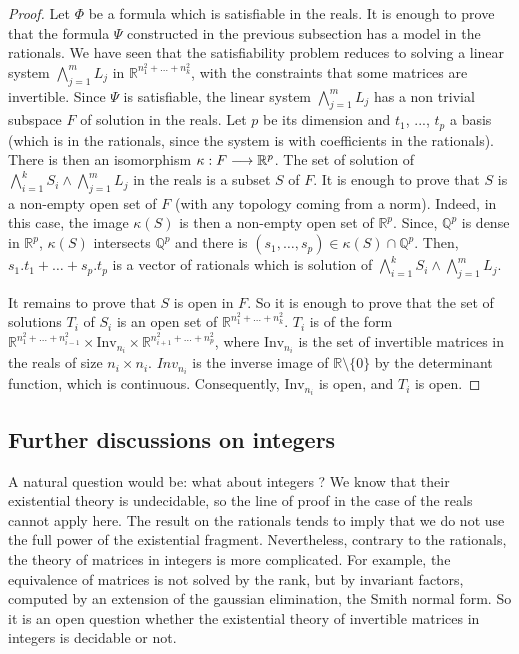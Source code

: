 \begin{proof}
Let $\Phi$ be a formula which is satisfiable in the reals. It is enough to prove that the formula $\Psi$ constructed in the previous subsection has a model in the rationals. We have seen that the satisfiability problem reduces to solving a linear system $\bigwedge\limits_{j=1}^m L_j$ in $\mathbb{R}^{n_1^2+\ldots+n_k^2}$, with the constraints that some matrices are invertible. Since $\Psi$ is satisfiable, the linear system $\bigwedge\limits_{j=1}^m L_j$ has a non trivial subspace $F$ of solution in the reals. Let $p$ be its dimension and $t_1$, ..., $t_p$ a basis (which is in the rationals, since the system is with coefficients in the rationals). 
There is then an isomorphism $\kappa : F \longrightarrow \mathbb{R}^p$. The set of solution of $\bigwedge\limits_{i=1}^k S_i \wedge \bigwedge\limits_{j=1}^m L_j$ in the reals is a subset $S$ of $F$. It is enough to prove that $S$ is a non-empty open set of $F$ (with any topology coming from a norm). Indeed, in this case, the image $\kappa(S)$ is then a non-empty open set of $\mathbb{R}^p$. Since, $\mathbb{Q}^p$ is dense in $\mathbb{R}^p$, $\kappa(S)$ intersects $\mathbb{Q}^p$ and there is $(s_1,\ldots,s_p) \in \kappa(S)\cap\mathbb{Q}^p$. Then, $s_1.t_1 + \ldots + s_p.t_p$ is a vector of rationals which is solution of $\bigwedge\limits_{i=1}^k S_i \wedge \bigwedge\limits_{j=1}^m L_j$.

It remains to prove that $S$ is open in $F$. So it is enough to prove that the set of solutions $T_i$ of $S_i$ is an open set of $\mathbb{R}^{n_1^2+\ldots+n_k^2}$. $T_i$ is of the form $\mathbb{R}^{n_1^2+\ldots+n_{i-1}^2}\times \text{Inv}_{n_i} \times \mathbb{R}^{n_{i+1}^2+\ldots+n_p^2}$, where $\text{Inv}_{n_i}$ is the set of invertible matrices in the reals of size $n_i\times n_i$.  $Inv_{n_i}$ is the inverse image of $\mathbb{R}\setminus\{0\}$ by the determinant function, which is continuous. Consequently, $\text{Inv}_{n_i}$ is open, and $T_i$ is open.
\end{proof}

\subsection{Further discussions on integers}

A natural question would be: what about integers ? We know that their existential theory is undecidable, so the line of proof in the case of the reals cannot apply here. The result on the rationals tends to imply that we do not use the full power of the existential fragment. Nevertheless, contrary to the rationals, the theory of matrices in integers is more complicated. For example, the equivalence of matrices is not solved by the rank, but by invariant factors, computed by an extension of the gaussian elimination, the Smith normal form. So it is an open question whether the existential theory of invertible matrices in integers is decidable or not.



